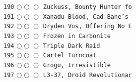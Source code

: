 \documentclass[a4paper,landscape]{article}
\begin{document}
\begin{multicols*}{5}
\texttt{190} \(\bigcirc\!\bigcirc\!\bigcirc\)  \texttt{Zuckuss, Bounty Hunter fo} \vspace{-0.3mm}\\ 
\texttt{191} \(\bigcirc\!\bigcirc\!\bigcirc\)  \texttt{Xanadu Blood, Cad Bane’s } \vspace{-0.3mm}\\ 
\texttt{192} \(\bigcirc\!\bigcirc\!\bigcirc\)  \texttt{Dryden Vos, Offering No E} \vspace{-0.3mm}\\ 
\texttt{193} \(\bigcirc\!\bigcirc\!\bigcirc\)  \texttt{Frozen in Carbonite} \vspace{-0.3mm}\\ 
\texttt{194} \(\bigcirc\!\bigcirc\!\bigcirc\)  \texttt{Triple Dark Raid} \vspace{-0.3mm}\\ 
\texttt{195} \(\bigcirc\!\bigcirc\!\bigcirc\)  \texttt{Cartel Turncoat} \vspace{-0.3mm}\\ 
\texttt{196} \(\bigcirc\!\bigcirc\!\bigcirc\)  \texttt{Grogu, Irresistible} \vspace{-0.3mm}\\ 
\texttt{197} \(\bigcirc\!\bigcirc\!\bigcirc\)  \texttt{L3-37, Droid Revolutionar} \vspace{-0.3mm}\\ 

\end{multicols*}
\end{document}
